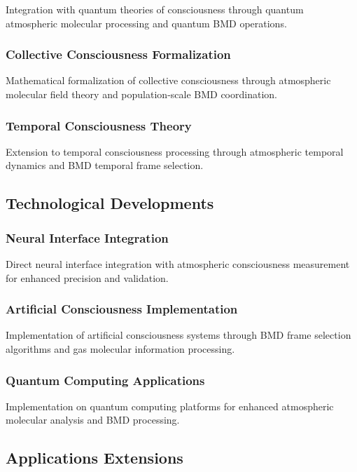 \documentclass[12pt,a4paper]{article}
\begin{document}
Integration with quantum theories of consciousness \citep{penrose1994shadows, hameroff1996orchestrated} through quantum atmospheric molecular processing and quantum BMD operations.

\subsubsection{Collective Consciousness Formalization}

Mathematical formalization of collective consciousness through atmospheric molecular field theory and population-scale BMD coordination.

\subsubsection{Temporal Consciousness Theory}

Extension to temporal consciousness processing through atmospheric temporal dynamics and BMD temporal frame selection.

\subsection{Technological Developments}

\subsubsection{Neural Interface Integration}

Direct neural interface integration with atmospheric consciousness measurement for enhanced precision and validation.

\subsubsection{Artificial Consciousness Implementation}

Implementation of artificial consciousness systems through BMD frame selection algorithms and gas molecular information processing.

\subsubsection{Quantum Computing Applications}

Implementation on quantum computing platforms for enhanced atmospheric molecular analysis and BMD processing.

\subsection{Applications Extensions}
\end{document}
